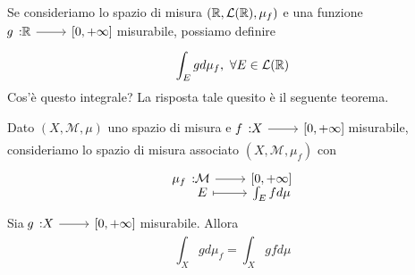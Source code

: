 Se consideriamo lo spazio di misura $\left(\mathbb{R},\mathcal{L}(\mathbb{R}),\mu_f\right)$ e una funzione $\funz{g}{\realset}{\left[0,+\infty\right]}$ misurabile, possiamo definire \begin{equation*}
	\int_Egd\mu_f,\ \forall E\in\mathcal{L}(\mathbb{R})
\end{equation*}
Cos'è questo integrale? La risposta tale quesito è il seguente teorema.
\begin{theorema}
	Dato $\left(X,\mathcal{M},\mu\right)$ uno spazio di misura e $\funz{f}{X}{\left[0,+\infty\right]}$ misurabile, consideriamo lo spazio di misura associato $\left(X,\mathcal{M},\mu_f\right)$ con
	\begin{equation*}
		\funztot{\mu_f}{\mathcal{M}}{\left[0,+\infty\right]}{E}{\int_Efd\mu}
	\end{equation*}
	Sia $\funz{g}{X}{\left[0,+\infty\right]}$ misurabile. Allora
	\begin{equation}
		\int_Xgd\mu_f=\int_Xgfd\mu
	\end{equation}
\end{theorema}
